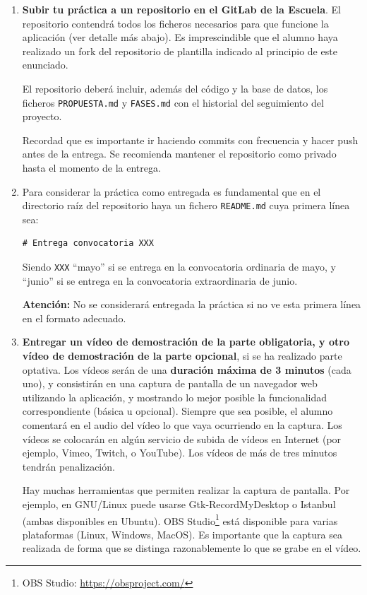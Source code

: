 \begin{enumerate}

  \item {\bf Subir tu práctica a un repositorio en el GitLab de la Escuela}. El repositorio contendrá todos los ficheros necesarios para que funcione la aplicación (ver detalle más abajo). Es imprescindible que el alumno haya realizado un fork del repositorio de plantilla indicado al principio de este enunciado.

El repositorio deberá incluir, además del código y la base de datos, los ficheros \texttt{PROPUESTA.md} y \texttt{FASES.md} con el historial del seguimiento del proyecto.

Recordad que es importante ir haciendo commits con frecuencia y hacer push antes de la entrega. Se recomienda mantener el repositorio como privado hasta el momento de la entrega.

\item Para considerar la práctica como entregada es fundamental que en el directorio raíz del repositorio haya un fichero \texttt{README.md} cuya primera línea sea:

\begin{verbatim}
# Entrega convocatoria XXX
\end{verbatim}

Siendo \texttt{XXX} ``mayo'' si se entrega en la convocatoria ordinaria de mayo, y ``junio'' si se entrega en la convocatoria extraordinaria de junio.

\textbf{Atención:} No se considerará entregada la práctica si no ve esta primera línea en el formato adecuado.

 \item {\bf Entregar un vídeo de demostración de la parte obligatoria, y otro vídeo de demostración de la parte opcional}, si se ha realizado parte optativa. Los vídeos serán de una {\bf duración máxima de 3 minutos} (cada uno), y consistirán en una captura de pantalla de un navegador web utilizando la aplicación, y mostrando lo mejor posible la funcionalidad correspondiente (básica u opcional). Siempre que sea posible, el alumno comentará en el audio del vídeo lo que vaya ocurriendo en la captura. Los vídeos se colocarán en algún servicio de subida de vídeos en Internet (por ejemplo, Vimeo, Twitch, o YouTube). Los vídeos de más de tres minutos tendrán penalización.

Hay muchas herramientas que permiten realizar la captura de pantalla. Por ejemplo, en GNU/Linux puede usarse Gtk-RecordMyDesktop o Istanbul (ambas disponibles en Ubuntu). OBS Studio\footnote{OBS Studio: \url{https://obsproject.com/}} está disponible para varias plataformas (Linux, Windows, MacOS). Es importante que la captura sea realizada de forma que se distinga razonablemente lo que se grabe en el vídeo.


\end{enumerate}
